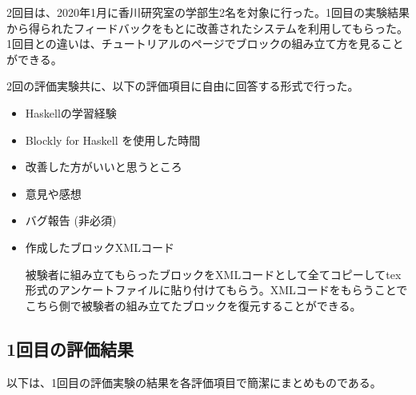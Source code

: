 \documentclass{risepaper}
\begin{document}
2回目は、2020年1月に香川研究室の学部生2名を対象に行った。1回目の実験結果から得られたフィードバックをもとに改善されたシステムを利用してもらった。1回目との違いは、チュートリアルのページでブロックの組み立て方を見ることができる。

2回の評価実験共に、以下の評価項目に自由に回答する形式で行った。

\begin{itemize}
\item Haskellの学習経験
\item Blockly for Haskell を使用した時間
\item 改善した方がいいと思うところ
\item 意見や感想
\item バグ報告 (非必須)
\item 作成したブロックXMLコード

被験者に組み立てもらったブロックをXMLコードとして全てコピーしてtex形式のアンケートファイルに貼り付けてもらう。XMLコードをもらうことでこちら側で被験者の組み立てたブロックを復元することができる。
\end{itemize} 

		\subsection{1回目の評価結果}

以下は、1回目の評価実験の結果を各評価項目で簡潔にまとめものである。
\end{document}
